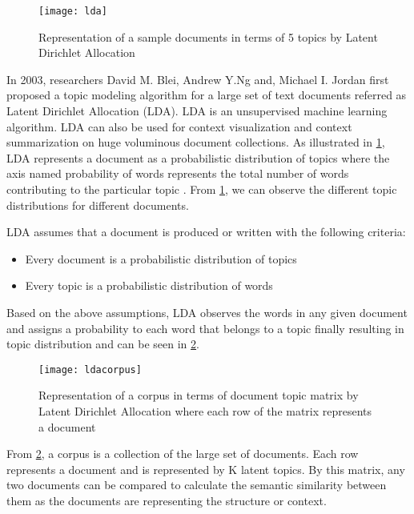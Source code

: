 \begin{figure}[htbp]
	\centering
		\texttt{[image: lda]}
	\caption{Representation of a sample documents in terms of 5 topics by Latent Dirichlet Allocation }
	\label{fig:lda}
\end{figure}

\par In 2003,  researchers David M. Blei, Andrew Y.Ng and, Michael I. Jordan first proposed a topic modeling algorithm for a large set of text documents referred as Latent Dirichlet Allocation (LDA). LDA is an unsupervised machine learning algorithm. LDA can also be used for context visualization and context summarization on huge voluminous document collections.  As illustrated in \ref{fig:lda}, LDA represents a document as a probabilistic distribution of topics where the axis named probability of words represents the total number of words contributing to the particular topic \cite{blei2003latent}. From \ref{fig:lda}, we can observe the different topic distributions for different documents.


\par LDA assumes that a document is produced or written with the following criteria:
\begin{itemize}
\item Every document is a probabilistic distribution of topics
\item Every topic is a probabilistic distribution of words
\end{itemize}

\par Based on the above assumptions, LDA observes the words in any given document and assigns a probability to each word that belongs to a topic finally resulting in topic distribution and can be seen in \ref{fig:ldacorpus}.
\begin{figure}[htbp]
	\centering
		\texttt{[image: ldacorpus]}
	\caption{Representation of a corpus in terms of document topic matrix by Latent Dirichlet Allocation where each row of the matrix represents a document}
	\label{fig:ldacorpus}
\end{figure}


\par From \ref{fig:ldacorpus}, a corpus is a collection of the large set of documents. Each row represents a document and is represented by K latent topics. By this matrix, any two documents can be compared to calculate the semantic similarity between them as the documents are representing the structure or context. 


